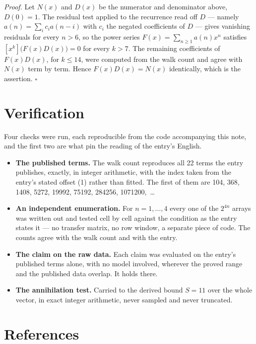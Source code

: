 \documentclass[11pt]{article}
\theoremstyle{definition}
\begin{document}
{\itshape Proof.} Let $N(x)$ and $D(x)$ be the numerator and denominator above, $D(0)=1$. The residual test applied to the recurrence read off $D$ --- namely $a(n) = \sum_i c_i a(n-i)$ with $c_i$ the negated coefficients of $D$ --- gives vanishing residuals for every $n > 6$, so the power series $F(x)=\sum_{n\ge 1}a(n)x^n$ satisfies $[x^k]\bigl(F(x)D(x)\bigr) = 0$ for every $k > 7$. The remaining coefficients of $F(x)D(x)$, for $k \le 14$, were computed from the walk count and agree with $N(x)$ term by term. Hence $F(x)D(x) = N(x)$ identically, which is the assertion. $\square$

\section{Verification}

Four checks were run, each reproducible from the code accompanying this note, and the first two are what pin the reading of the entry's English.

\begin{itemize}

\item {\bfseries The published terms.} The walk count reproduces all 22 terms the entry publishes, exactly, in integer arithmetic, with the index taken from the entry's stated offset (1) rather than fitted. The first of them are 104, 368, 1408, 5272, 19992, 75192, 284256, 1071200,~\dots

\item {\bfseries An independent enumeration.} For $n = 1,\dots,4$ every one of the $2^{4n}$ arrays was written out and tested cell by cell against the condition as the entry states it --- no transfer matrix, no row window, a separate piece of code. The counts agree with the walk count and with the entry.

\item {\bfseries The claim on the raw data.} Each claim was evaluated on the entry's published terms alone, with no model involved, wherever the proved range and the published data overlap. It holds there.

\item {\bfseries The annihilation test.} Carried to the derived bound $S = 11$ over the whole vector, in exact integer arithmetic, never sampled and never truncated.

\end{itemize}

\section{References}
\end{document}
